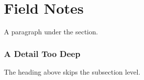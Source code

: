 \documentclass{article}
\begin{document}
\section{Field Notes}

A paragraph under the section.

\subsubsection{A Detail Too Deep}

The heading above skips the subsection level.
\end{document}
